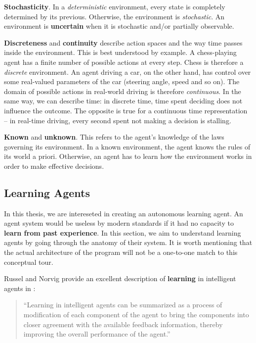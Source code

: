 \textbf{Stochasticity}.
In a \emph{deterministic} environment, every state is completely determined by its previous. Otherwise, the environment is \emph{stochastic}. An environment is \textbf{uncertain} when it is stochastic and/or partially observable.

\textbf{Discreteness} and \textbf{continuity} describe action spaces and the way time passes inside the environment.
This is best understood by example.
A chess-playing agent has a finite number of possible actions at every step.
Chess is therefore a \emph{discrete} environment.
An agent driving a car, on the other hand, has control over some real-valued parameters of the car (steering angle, speed and so on).
The domain of possible actions in real-world driving is therefore \emph{continuous}.
In the same way, we can describe time: in discrete time, time spent deciding does not influence the outcome. The opposite is true for a continuous time representation -- in real-time driving, every second spent not making a decision is stalling.

\textbf{Known} and \textbf{unknown}.
This refers to the agent's knowledge of the laws governing its environment. In a known environment, the agent knows the rules of its world a priori. Otherwise, an agent has to learn how the environment works in order to make effective decisions.


\subsection{Learning Agents} \label{learning-agents}
In this thesis, we are intereseted in creating an autonomous learning agent.
An agent system would be useless by modern standards if it had no capacity to \textbf{learn from past experience}.
In this section, we aim to understand learning agents by going through the anatomy of their system.
It is worth mentioning that the actual architecture of the program will not be a one-to-one match to this conceptual tour.

Russel and Norvig provide an excellent description of \textbf{learning} in intelligent agents in \cite{aima}:
\begin{quote}
    ``Learning in intelligent agents can be summarized as a process of modification of each component of the agent to bring the components into closer agreement with the available feedback information, thereby improving the overall performance of the agent.''
\end{quote}

